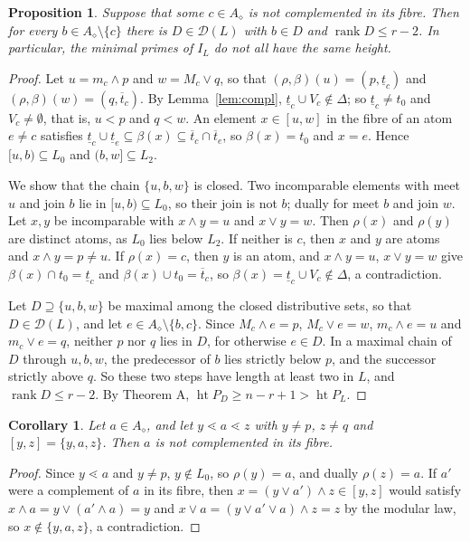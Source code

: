\documentclass{amsart}
\newtheorem{proposition}[theorem]{Proposition}
\newtheorem{corollary}[theorem]{Corollary}
\theoremstyle{definition}
\DeclareMathOperator{\rk}{rank}
\DeclareMathOperator{\htop}{ht}
\newcommand{\cD}{\mathcal D}
\newcommand{\dm}{\diamond}
\newcommand{\lt}{\underline{t}}
\newcommand{\ut}{\overline{t}}
\begin{document}
\begin{proposition}\label{prop:local}
Suppose that some $c\in A_\dm$ is not complemented in its fibre. Then for every $b\in A_\dm\setminus\{c\}$ there is $D\in\cD(L)$ with $b\in D$ and $\rk D\le r-2$. In particular, the minimal primes of $I_L$ do not all have the same height.
\end{proposition}

\begin{proof}
Let $u=m_c\wedge p$ and $w=M_c\vee q$, so that $(\rho,\beta)(u)=(p,\lt_c)$ and $(\rho,\beta)(w)=(q,\ut_c)$. By Lemma~\ref{lem:compl}, $\lt_c\cup V_c\notin\Delta$; so $\lt_c\ne t_0$ and $V_c\ne\emptyset$, that is, $u<p$ and $q<w$. An element $x\in[u,w]$ in the fibre of an atom $e\ne c$ satisfies $\lt_c\cup\lt_e\subseteq\beta(x)\subseteq\ut_c\cap\ut_e$, so $\beta(x)=t_0$ and $x=e$. Hence $[u,b)\subseteq L_0$ and $(b,w]\subseteq L_2$.

We show that the chain $\{u,b,w\}$ is closed. Two incomparable elements with meet $u$ and join $b$ lie in $[u,b)\subseteq L_0$, so their join is not $b$; dually for meet $b$ and join $w$. Let $x,y$ be incomparable with $x\wedge y=u$ and $x\vee y=w$. Then $\rho(x)$ and $\rho(y)$ are distinct atoms, as $L_0$ lies below $L_2$. If neither is $c$, then $x$ and $y$ are atoms and $x\wedge y=p\ne u$. If $\rho(x)=c$, then $y$ is an atom, and $x\wedge y=u$, $x\vee y=w$ give $\beta(x)\cap t_0=\lt_c$ and $\beta(x)\cup t_0=\ut_c$, so $\beta(x)=\lt_c\cup V_c\notin\Delta$, a contradiction.

Let $D\supseteq\{u,b,w\}$ be maximal among the closed distributive sets, so that $D\in\cD(L)$, and let $e\in A_\dm\setminus\{b,c\}$. Since $M_c\wedge e=p$, $M_c\vee e=w$, $m_c\wedge e=u$ and $m_c\vee e=q$, neither $p$ nor $q$ lies in $D$, for otherwise $e\in D$. In a maximal chain of $D$ through $u,b,w$, the predecessor of $b$ lies strictly below $p$, and the successor strictly above $q$. So these two steps have length at least two in $L$, and $\rk D\le r-2$. By Theorem A, $\htop P_D\ge n-r+1>\htop P_L$.
\end{proof}

\begin{corollary}\label{cor:local}
Let $a\in A_\dm$, and let $y\lessdot a\lessdot z$ with $y\ne p$, $z\ne q$ and $[y,z]=\{y,a,z\}$. Then $a$ is not complemented in its fibre.
\end{corollary}

\begin{proof}
Since $y\lessdot a$ and $y\ne p$, $y\notin L_0$, so $\rho(y)=a$, and dually $\rho(z)=a$. If $a'$ were a complement of $a$ in its fibre, then $x=(y\vee a')\wedge z\in[y,z]$ would satisfy $x\wedge a=y\vee(a'\wedge a)=y$ and $x\vee a=(y\vee a'\vee a)\wedge z=z$ by the modular law, so $x\notin\{y,a,z\}$, a contradiction.
\end{proof}
\end{document}
